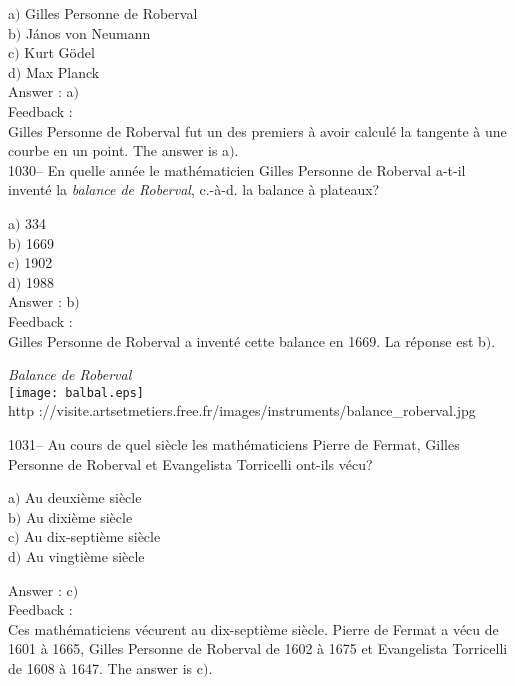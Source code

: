 \documentclass[letterpaper, 12pt]{article}
\begin{document}
a$)$ Gilles Personne de Roberval  \\
b$)$ J\'anos von Neumann  \\
c$)$ Kurt G\"odel \\
d$)$ Max Planck\\

Answer : a$)$\\

Feedback :\\
Gilles Personne de Roberval fut un des premiers \`a avoir calcul\'e
la tangente \`a une courbe en un point.
The answer is a$)$.\\

1030-- En quelle ann\'ee le math\'ematicien Gilles Personne de
Roberval a-t-il invent\'e la {\sl balance de Roberval}, c.-\`a-d. la
balance \`a plateaux?

a$)$ 334  \\
b$)$ 1669 \\
c$)$ 1902  \\
d$)$ 1988 \\

Answer : b$)$\\

Feedback :\\
Gilles Personne de Roberval a invent\'e cette balance en 1669. La r\'eponse
est b$)$.\\

        \begin{center}
        {\sl Balance de Roberval}\\
    \texttt{[image: balbal.eps]}\\
        {\footnotesize http
://visite.artsetmetiers.free.fr/images/instruments/balance\_roberval.jpg}
    \end{center}

1031-- Au cours de quel si\`ecle les math\'ematiciens Pierre de
Fermat, Gilles Personne de Roberval et Evangelista Torricelli
ont-ils v\'ecu?

a$)$ Au deuxi\`eme si\`ecle \\
b$)$ Au dixi\`eme si\`ecle \\
c$)$ Au dix-septi\`eme si\`ecle \\
d$)$ Au vingti\`eme si\`ecle

Answer : c$)$\\

Feedback : \\
Ces math\'ematiciens v\'ecurent au dix-septi\`eme si\`ecle. Pierre
de Fermat a v\'ecu de 1601 \`a 1665,
Gilles Personne de Roberval de 1602 \`a 1675 et Evangelista Torricelli de
1608 \`a 1647. The answer is c$)$.\\
\end{document}
